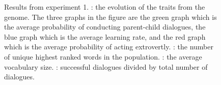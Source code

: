 \begin{figure}
    \centering
    \ContinuedFloat
    \hfill
    \par \bigskip
    \hfill
    \caption{Results from experiment 1. : the evolution of the traits from the genome. The three graphs in the figure are the green graph which is the average probability of conducting parent-child dialogues, the blue graph which is the average learning rate, and the  red graph which is the average probability of acting extrovertly. : the number of unique highest ranked words in the population. : the average vocabulary size. : successful dialogues divided by total number of dialogues.}
    \label{fig:exp1.1}
\end{figure}
